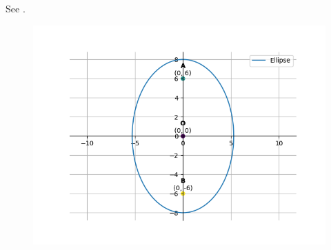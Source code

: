 See
	.
\begin{figure}[H]
	\centering
	\includegraphics[width=0.75\columnwidth]{chapters/11/11/3/16/figs/fig.png}
	\caption{}
	\label{fig:11/11/3/16}
\end{figure}


